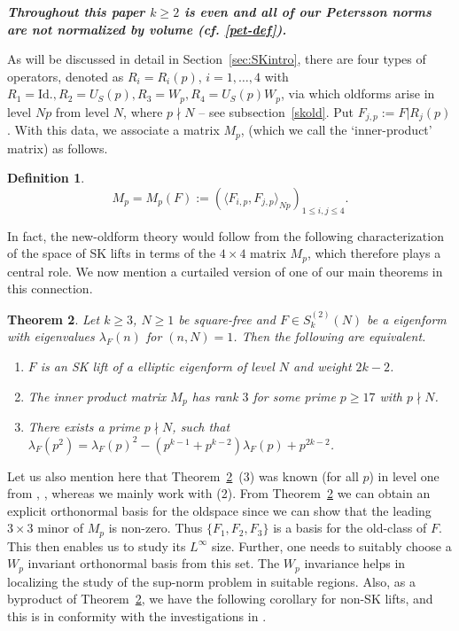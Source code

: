 \documentclass[11pt]{amsart}
\numberwithin{equation}{section}
\theoremstyle{plain}
\newtheorem{thm}{Theorem}[section]
\theoremstyle{definition}
\newtheorem{defi}[thm]{Definition}
\newcommand{\thmref}[1]{Theorem~\ref{#1}}
\newcommand{\mrm}{\mathrm}
\newcommand{\lan}{\langle }
\newcommand{\ran}{\rangle}
\newcommand{\stwon}{S^{(2)}_k(N)}
\begin{document}
\textbf{ \textsl{Throughout this paper $k \ge 2$ is even and all of our Petersson norms are not normalized by volume (cf. \eqref{pet-def}).}}

As will be discussed in detail in Section~\ref{sec:SKintro}, there are four types of operators, denoted as $R_i=R_i(p)$, $i=1,\ldots, 4$ with $R_1=\mrm{Id.}, R_2=U_S(p), R_3=W_p, R_4=U_S(p)W_p$, via which oldforms arise in level $Np$ from level $N$, where $p\nmid N$ -- see subsection~\ref{skold}. Put $F_{j,p} := F|R_j(p)$.
With this data, we associate a matrix $M_p$, (which we call the `inner-product' matrix) as follows.
\begin{defi}
     \begin{equation}\label{Mpdef}
       M_p=M_p(F):=\left(\lan F_{i,p}, F_{j,p} \ran_{Np} \right)_{1\le i, j\le 4}.
    \end{equation}
\end{defi}
In fact, the new-oldform theory would follow from the following characterization of the space of SK lifts in terms of the $4 \times 4$ matrix $M_p$, which therefore plays a central role. We now mention a curtailed version of one of our main theorems in this connection.

\begin{thm}\label{skchar-intro}
    Let $k \ge 3$, $N \ge 1$ be square-free and $F \in \stwon$ be a eigenform with eigenvalues $\lambda_F(n)$ for $(n,N)=1$. Then the following are equivalent.
    \begin{enumerate}
        \item $F$ is an SK lift of a elliptic eigenform of level $N$ and weight $2k-2$.
        \item The inner product matrix $M_p$ has rank $3$ for some prime $p \ge 17$ with $p\nmid N$.
        \item There exists a prime $p\nmid N$, such that $\displaystyle
            \lambda_F(p^2)=\lambda_F(p)^2-(p^{k-1}+p^{k-2})\lambda_F(p)+p^{2k-2}$.
    \end{enumerate}
\end{thm}
Let us also mention here that \thmref{skchar-intro}~(3) was known (for all $p$) in level one from \cite{farmer2013survey}, \cite{saha-pitale},  whereas we mainly work with (2). From \thmref{skchar-intro} we can obtain an explicit orthonormal basis for the oldspace since we can show that the leading $3 \times 3$ minor of $M_p$ is non-zero. Thus $\{F_1,F_2,F_3 \}$ is a basis for the old-class of $F$. 
This then enables us to study its $L^\infty$ size. 
Further, one needs to suitably choose a $W_p$ invariant orthonormal basis from this set.
The $W_p$ invariance helps in localizing the study of the sup-norm problem in suitable regions. Also, as a byproduct of \thmref{skchar-intro}, we have the following corollary for non-SK lifts, and this is in conformity with the investigations in \cite{schmidt-AL}.
\end{document}
